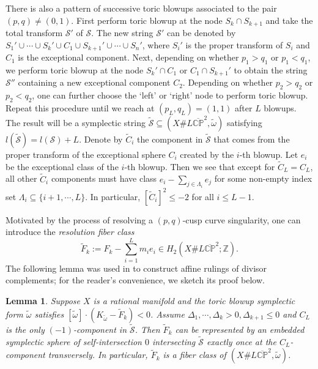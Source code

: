 \documentclass[11pt]{article}
\newtheorem{lemma}[theorem]{Lemma}
\theoremstyle{definition}
\theoremstyle{remark}
\newcommand{\CP}{\mathbb{CP}}
\newcommand{\st}{\mathcal{S}}
\begin{document}
There is also a pattern of successive toric blowups associated to the pair $(p,q)\neq (0,1)$. First perform toric blowup at the node $S_k\cap S_{k+1}$ and take the total transform $\st'$ of $\st$. The new string $\st'$ can be denoted by $S_1'\cup\cdots\cup S_k'\cup C_1\cup S_{k+1}'\cup\cdots\cup S_n'$, where $S_i'$ is the proper transform of $S_i$ and $C_1$ is the exceptional component. Next, depending on whether $p_1>q_1$ or $p_1<q_1$, we perform toric blowup at the node $S_k'\cap C_1$ or $C_1\cap S_{k+1}'$ to obtain the string $\st''$ containing a new exceptional component $C_2$. Depending on whether $p_2>q_2$ or $p_2<q_2$, one can further choose the `left' or `right' node to perform toric blowup. Repeat this procedure until we reach at $(p_L,q_L)=(1,1)$ after $L$ blowups. The result will be a symplectic string $\tilde{\st}\subseteq(X\# L\overline{\CP}^2,\tilde{\omega})$ satisfying $l(\tilde{\st})=l(\st)+L$. Denote by $\tilde{C}_i$ the component in $\tilde{\st}$ that comes from the proper transform of the exceptional sphere $C_i$ created by the $i$-th blowup. Let $e_i$ be the exceptional class of the $i$-th blowup. Then we see that except for $\tilde{C}_L=C_L$, all other $\tilde{C}_i$ components must have class $e_i-\sum_{j\in \Lambda_i} e_j$ for some non-empty index set $\Lambda_i\subseteq \{i+1,\cdots,L\}$. In particular, $[\tilde{C}_i]^2\leq -2$ for all $i\leq L-1$.

Motivated by the process of resolving a $(p,q)$-cusp curve singularity, one can introduce the \emph{resolution fiber class}
\[\tilde{F}_k:=F_k-\sum_{i=1}^L m_ie_i\in H_2(X\# L\overline{\CP}^2;\mathbb{Z}).\]
The following lemma was used in \cite{LN25} to construct affine rulings of divisor complements; for the reader's convenience, we sketch its proof below.

\begin{lemma}\label{lem:resolutionfiberclass}
 Suppose $X$ is a rational manifold and the toric blowup symplectic form $\tilde{\omega}$ satisfies $[\tilde{\omega}]\cdot(K_{\tilde{\omega}}-\tilde{F}_k)<0$. Assume $\Delta_1,\cdots,\Delta_k>0,\Delta_{k+1}\leq 0$ and $C_L$ is the only $(-1)$-component in $\tilde{\st}$. Then $\tilde{F}_k$ can be represented by an embedded symplectic sphere of self-intersection $0$ intersecting $\tilde{\st}$ exactly once at the $C_L$-component transversely. In particular, $\tilde{F}_k$ is a fiber class of $(X\# L\overline{\CP}^2,\tilde{\omega})$.
\end{lemma}
\end{document}
